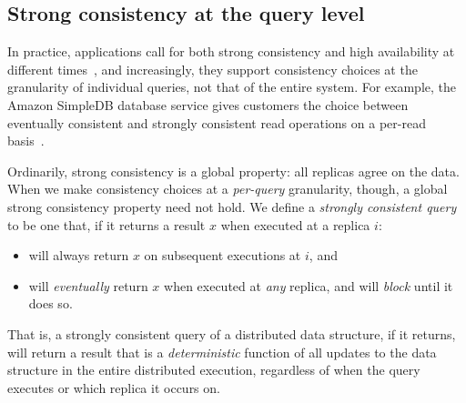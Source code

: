 


\subsection{Strong consistency at the query level}

In practice, applications call for both strong consistency and high
availability at different times~\cite{pileus}, and increasingly, 
they support consistency choices at
the granularity of individual queries, not that of the entire system.
For example, the Amazon SimpleDB database service gives customers the
choice between eventually consistent and strongly consistent read
operations on a per-read basis~\cite{simpledb-vogels-article}.


Ordinarily, strong consistency is a global property: all replicas agree on the
data.  When we make consistency choices at a \emph{per-query} granularity,
though, a global strong consistency property need not hold.  We define a
\emph{strongly consistent query} to be one that, if it returns a result
$x$ when executed at a replica $i$:
\begin{itemize}
  \item will always return $x$ on subsequent executions at $i$, and
  \item will \emph{eventually} return $x$ when executed at \emph{any}
    replica, and will \emph{block} until it does so.
\end{itemize}
That is, a strongly consistent query of a distributed data structure,
if it returns, will return a result that is a \emph{deterministic}
function of all updates to the data structure in the entire
distributed execution, regardless of when the query executes or which
replica it occurs on.



